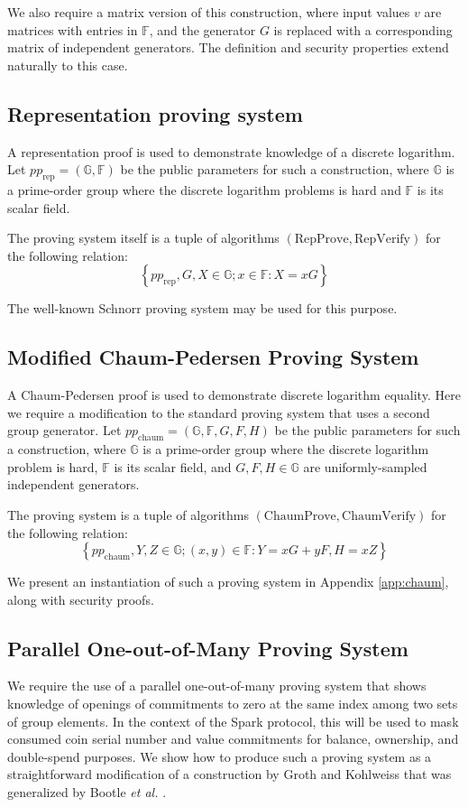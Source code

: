 \documentclass{llncs}
\newcommand{\G}{\mathbb{G}}
\newcommand{\F}{\mathbb{F}}
\begin{document}
We also require a matrix version of this construction, where input values $v$ are matrices with entries in $\F$, and the generator $G$ is replaced with a corresponding matrix of independent generators.
The definition and security properties extend naturally to this case.


\subsection{Representation proving system}

A representation proof is used to demonstrate knowledge of a discrete logarithm.
Let $pp_{\text{rep}} = (\G, \F)$ be the public parameters for such a construction, where $\G$ is a prime-order group where the discrete logarithm problems is hard and $\F$ is its scalar field.

The proving system itself is a tuple of algorithms $(\text{RepProve},\text{RepVerify})$ for the following relation:
$$\left\{ pp_{\text{rep}}, G, X \in \G ; x \in \F : X = xG \right\}$$

The well-known Schnorr proving system may be used for this purpose.


\subsection{Modified Chaum-Pedersen Proving System}

A Chaum-Pedersen proof is used to demonstrate discrete logarithm equality.
Here we require a modification to the standard proving system that uses a second group generator.
Let $pp_{\text{chaum}} = (\G, \F, G, F, H)$ be the public parameters for such a construction, where $\G$ is a prime-order group where the discrete logarithm problem is hard, $\F$ is its scalar field, and $G,F,H \in \G$ are uniformly-sampled independent generators.

The proving system is a tuple of algorithms $(\text{ChaumProve},\text{ChaumVerify})$ for the following relation:
$$\left\{ pp_{\text{chaum}}, Y, Z \in \G ; (x, y) \in \F : Y = xG + yF, H = xZ \right\}$$

We present an instantiation of such a proving system in Appendix \ref{app:chaum}, along with security proofs.


\subsection{Parallel One-out-of-Many Proving System}

We require the use of a parallel one-out-of-many proving system that shows knowledge of openings of commitments to zero at the same index among two sets of group elements.
In the context of the Spark protocol, this will be used to mask consumed coin serial number and value commitments for balance, ownership, and double-spend purposes.
We show how to produce such a proving system as a straightforward modification of a construction by Groth and Kohlweiss \cite{groth} that was generalized by Bootle \textit{et al.} \cite{bootle}.
\end{document}
